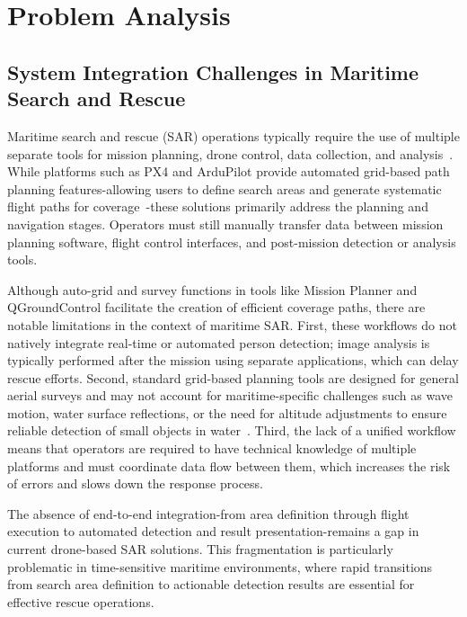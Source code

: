 \chapter{Problem Analysis}

\section{System Integration Challenges in Maritime Search and Rescue}

Maritime search and rescue (SAR) operations typically require the use of multiple separate tools for mission planning, drone control, data collection, and analysis~\cite{connectivity_challenges_2024, uav_holistic_2024}. While platforms such as PX4 and ArduPilot provide automated grid-based path planning features-allowing users to define search areas and generate systematic flight paths for coverage~\cite{ardupilot_grid_2023, px4_mission_2024}-these solutions primarily address the planning and navigation stages. Operators must still manually transfer data between mission planning software, flight control interfaces, and post-mission detection or analysis tools.

Although auto-grid and survey functions in tools like Mission Planner and QGroundControl facilitate the creation of efficient coverage paths, there are notable limitations in the context of maritime SAR. First, these workflows do not natively integrate real-time or automated person detection; image analysis is typically performed after the mission using separate applications, which can delay rescue efforts. Second, standard grid-based planning tools are designed for general aerial surveys and may not account for maritime-specific challenges such as wave motion, water surface reflections, or the need for altitude adjustments to ensure reliable detection of small objects in water~\cite{SARSurvey2024}. Third, the lack of a unified workflow means that operators are required to have technical knowledge of multiple platforms and must coordinate data flow between them, which increases the risk of errors and slows down the response process.

The absence of end-to-end integration-from area definition through flight execution to automated detection and result presentation-remains a gap in current drone-based SAR solutions. This fragmentation is particularly problematic in time-sensitive maritime environments, where rapid transitions from search area definition to actionable detection results are essential for effective rescue operations.


